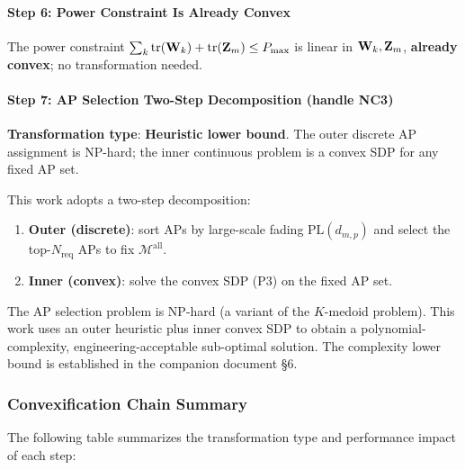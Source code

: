 \paragraph{Step 6: Power Constraint Is Already Convex}
The power constraint $\sum_k \text{tr}(\mathbf{W}_k) + \text{tr}(\mathbf{Z}_m) \leq P_{\max}$ is linear in $\mathbf{W}_k, \mathbf{Z}_m$, \textbf{already convex}; no transformation needed.

\paragraph{Step 7: AP Selection Two-Step Decomposition (handle NC3)}
\textbf{Transformation type}: \textbf{Heuristic lower bound}. The outer discrete AP assignment is NP-hard; the inner continuous problem is a convex SDP for any fixed AP set.

This work adopts a two-step decomposition:
\begin{enumerate}
    \item \textbf{Outer (discrete)}: sort APs by large-scale fading $\text{PL}(d_{m,p})$ and select the top-$N_{\text{req}}$ APs to fix $\mathcal{M}^{\text{all}}$.
    \item \textbf{Inner (convex)}: solve the convex SDP (P3) on the fixed AP set.
\end{enumerate}

\begin{remark}\label{rem:ap_heuristic}
The AP selection problem is NP-hard (a variant of the $K$-medoid problem). This work uses an outer heuristic plus inner convex SDP to obtain a polynomial-complexity, engineering-acceptable sub-optimal solution. The complexity lower bound is established in the companion document §6.
\end{remark}

\subsubsection{Convexification Chain Summary}

The following table summarizes the transformation type and performance impact of each step:

